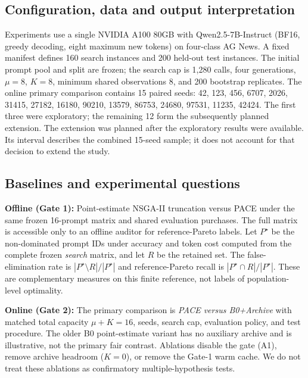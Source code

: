 \documentclass{article}
\begin{document}
\subsection{Configuration, data and output interpretation}
\label{sec:data-protocol}
Experiments use a single NVIDIA A100 80GB with Qwen2.5-7B-Instruct (BF16, greedy decoding, eight maximum new tokens) on four-class AG News. A fixed manifest defines 160 search instances and 200 held-out test instances. The initial prompt pool and split are frozen; the search cap is 1,280 calls, four generations, $\mu=8$, $K=8$, minimum shared observations 8, and 200 bootstrap replicates. The online primary comparison contains 15 paired seeds: 42, 123, 456, 6707, 2026, 31415, 27182, 16180, 90210, 13579, 86753, 24680, 97531, 11235, 42424. The first three were exploratory; the remaining 12 form the subsequently planned extension. The extension was planned after the exploratory results were available. Its interval describes the combined 15-seed sample; it does not account for that decision to extend the study.



\subsection{Baselines and experimental questions}
\textbf{Offline (Gate 1):} Point-estimate NSGA-II truncation versus PACE under the same frozen 16-prompt matrix and shared evaluation purchases. The full matrix is accessible only to an offline auditor for reference-Pareto labels. Let $P^\star$ be the non-dominated prompt IDs under accuracy and token cost
computed from the complete frozen \emph{search} matrix, and let $R$ be the retained
set. The false-elimination rate is
$|P^\star\setminus R|/|P^\star|$ and reference-Pareto recall is
$|P^\star\cap R|/|P^\star|$. These are complementary measures on this finite
reference, not labels of population-level optimality.

\textbf{Online (Gate 2):} The primary comparison is \emph{PACE versus B0+Archive} with matched total capacity $\mu+K=16$, seeds, search cap, evaluation policy, and test procedure. The older B0 point-estimate variant has no auxiliary archive and is illustrative, not the primary fair contrast. Ablations disable the gate (A1), remove archive headroom ($K=0$), or remove the Gate-1 warm cache. We do not treat these ablations as confirmatory multiple-hypothesis tests.


\end{document}
